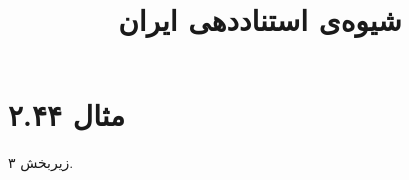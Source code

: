 \documentclass[a4paper,10pt]{article}
\begin{document}
\title{شیوه‌ی استناددهی ایران}
\author{}
\date{}
\maketitle



\section*{مثال ۲.۴۴}

زیربخش ۳.\\
\cite{بوسکالیا1978}\\
\cite{خوشدل1379}\\
\\
\\






\end{document}
